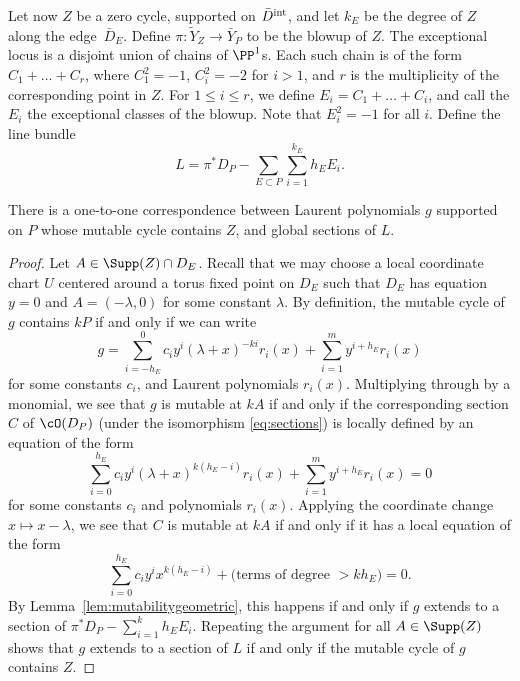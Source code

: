 Let now $Z$ be a zero cycle, supported on $\bar{D}^{\rm int}$, and let $k_E$ be the degree of $Z$ along the edge~$\bar{D}_E$.
Define $\pi \colon \tilde{Y}_Z \rightarrow \bar{Y}_P$ to be the blowup of $Z$. The exceptional locus is a disjoint union of chains of $\PP^1$s. Each such chain is of the form $C_1+\dots +C_r$, where $C_1^2=-1$, $C_i^2=-2$ for $i>1$, and $r$ is the multiplicity of the corresponding point in $Z$. For $1 \leq i \leq r$, we define $E_i=C_1+\dots+C_i$, and call the $E_i$ the exceptional classes of the blowup. Note that $E_i^2=-1$ for all $i$. Define the line bundle
\[
L=\pi^*D_P-\sum_{E\subset P} \sum_{i=1}^{k_E} h_EE_i.
\]
	\begin{Theorem}\label{thm:MMLPassections}
There is a one-to-one correspondence between Laurent polynomials $g$ supported on $P$ whose mutable cycle contains $Z$, and global sections of $L$.
\end{Theorem}
\begin{proof}
	Let $A \in \Supp(Z) \cap D_E$. Recall that we may choose a local coordinate chart $U$ centered around a torus fixed point on $D_E$ such that $D_E$ has equation $y=0$ and $A=(-\lambda, 0)$ for some constant $\lambda$. By definition, the mutable cycle of $g$ contains $kP$ if and only if we can write
	\[
	g=	
	\sum_{i=-h_E}^{0}c_i{y^{i}}(\lambda+x)^{-ki}{r}_{i}(x)+\sum_{i=1}^m {y^{i+h_E}}{r}_i(x)
	\]
	for some constants $c_i$, and Laurent polynomials $r_i(x)$.
	Multiplying through by a monomial, we see that $g$ is mutable at $kA$ if and only if the corresponding section $C$ of $\cO(D_P)$ (under the isomorphism \eqref{eq:sections}) is locally defined by an equation of the form
	\[	
	\sum_{i=0}^{h_E}c_i{y^{i}}(\lambda+x)^{k(h_E-i)}{r}_{i}(x)+\sum_{i=1}^m {y^{i+h_E}}{r}_i(x)=0
	\]
	for some constants $c_i$ and polynomials $r_i(x)$.
	Applying the coordinate change $x \mapsto x-\lambda$, we see that $C$ is mutable at $kA$ if and only if it has a local equation of the form
	\[	
	\sum_{i=0}^{h_E}c_i{y^{i}}x^{k(h_E-i)}+\text{(terms of degree $>kh_E$)}=0.
	\]
	By Lemma~\ref{lem:mutabilitygeometric}, this happens if and only if $g$ extends to a section of $\pi^*D_P-\sum_{i=1}^k h_E E_i$. Repeating the argument for all $A \in \Supp(Z)$ shows that $g$ extends to a section of $L$ if and only if the mutable cycle of $g$ contains $Z$.
	\end{proof}

